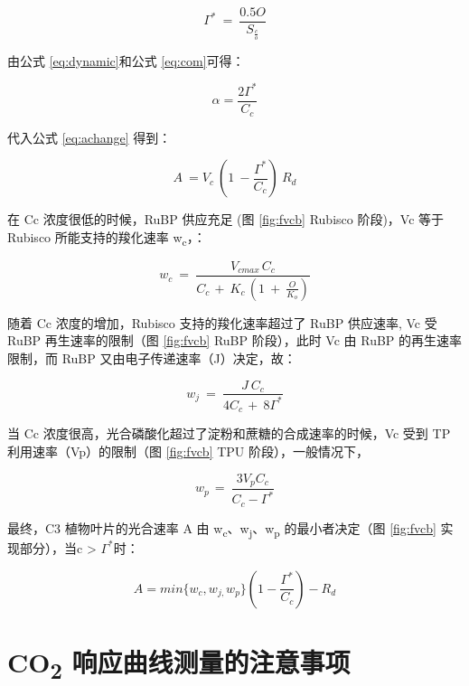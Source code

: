 \documentclass[
]{krantz}
\begin{document}
\begin{equation}
\Gamma^{*}\ =\ \frac{0.5O}{S_{\frac{c}{o}}}
\label{eq:com}
\end{equation}

由公式 \eqref{eq:dynamic}和公式 \eqref{eq:com}可得：

\begin{equation}
\alpha =\frac{2\Gamma^{*}}{C_{c}}
\label{eq:combine}
\end{equation}

代入公式 \eqref{eq:achange} 得到：

\begin{equation}
A\ =V_{c}\ (1\ -\frac{\Gamma^{*}}{C_{c}})\ R_{d}
\label{eq:combine2}
\end{equation}

在 Cc 浓度很低的时候，RuBP 供应充足 (图 \ref{fig:fvcb} Rubisco 阶段)，Vc 等于 Rubisco
所能支持的羧化速率 w\textsubscript{c}，：

\begin{equation}
w_{c}\ =\ \frac{V_{cmax\ }C_{c}}{C_{c\ }+\ K_{c\ }(1\ +\ \frac{O}{K_{o}})}
\label{eq:wc}
\end{equation}

随着 Cc 浓度的增加，Rubisco 支持的羧化速率超过了 RuBP 供应速率, Vc 受 RuBP 再生速率的限制（图 \ref{fig:fvcb}
RuBP 阶段），此时 Vc 由 RuBP 的再生速率限制，而 RuBP 又由电子传递速率（J）决定，故：

\begin{equation}
w_{j}\ =\ \frac{J\ C_{c}}{4C_{c\ }+\ 8\Gamma^{*}}
\label{eq:wj}
\end{equation}

当 Cc 浓度很高，光合磷酸化超过了淀粉和蔗糖的合成速率的时候，Vc 受到 TP 利用速率（Vp）的限制（图 \ref{fig:fvcb}
TPU 阶段），一般情况下，

\begin{equation}
w_{p\ }=\ \frac{3V_{p}C_{c}}{C_{c}-\Gamma^{*}}
\label{eq:wp}
\end{equation}

最终，C3 植物叶片的光合速率 A 由 w\textsubscript{c}、w\textsubscript{j}、w\textsubscript{p}
的最小者决定（图 \ref{fig:fvcb} 实现部分），当c \textgreater{} \(\Gamma^{*}\)时：

\begin{equation}
A=min\{w_{c},w_{j,}w_{p}\}(1-\frac{\Gamma^{*}}{C_{c}})-R_{d}
\label{eq:fvcbfin}
\end{equation}

\hypertarget{co2_note}{%
\section{\texorpdfstring{CO\textsubscript{2} 响应曲线测量的注意事项}{CO2 响应曲线测量的注意事项}}\label{co2_note}}
\end{document}
